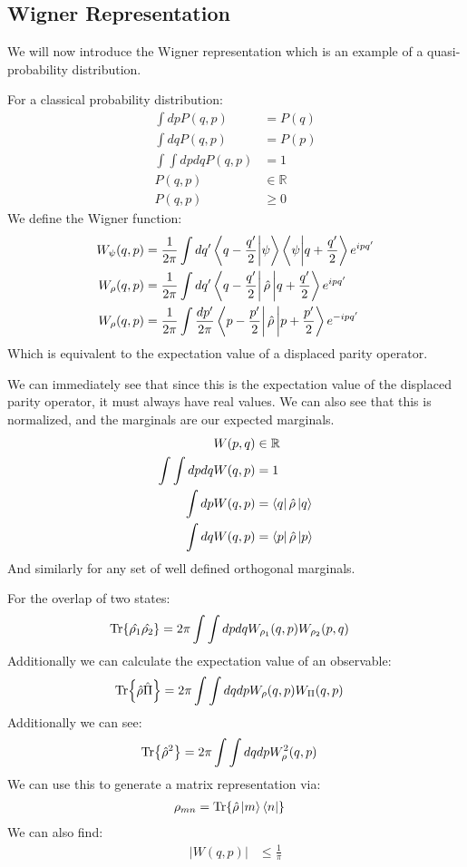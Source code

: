 \subsection{Wigner Representation}
We will now introduce the Wigner representation which is an example of a quasi-probability distribution.

For a classical probability distribution:
\begin{align*}
	\int dp P(q,p) &= P(q) \\
	\int dq P(q,p)&= P(p) \\
	\int\int dpdq P(q,p) &= 1 \\
	P(q,p) &\in \mathbb{R} \\
	P(q,p) & \geq 0
\end{align*}
We define the Wigner function:
\begin{align*}
	W_\psi(q,p) &= \frac{1}{2\pi} \int dq' \bra{q - \frac{q'}{2}}\ket{\psi}\bra{\psi}\ket{q + \frac{q'}{2}} e^{ipq'} \\
	W_\rho(q,p) &= \frac{1}{2\pi} \int dq' \bra{q - \frac{q'}{2}}\hat{\rho}\ket{q + \frac{q'}{2}} e^{ipq'} \\
	W_\rho(q,p) &= \frac{1}{2\pi} \int \frac{dp'}{2\pi} \bra{p - \frac{p'}{2}}\hat{\rho}\ket{p + \frac{p'}{2}} e^{-ipq'}
\end{align*}
Which is equivalent to the expectation value of a displaced parity operator.

We can immediately see that since this is the expectation value of the displaced parity operator, it must always have real values.
We can also see that this is normalized, and the marginals are our expected marginals.
\begin{align*}
	W(p,q) &\in \mathbb{R} \\
	\int\int dpdq W(q,p) &= 1 \\
	\int dp W(q,p) &= \bra{q}\hat{\rho}\ket{q} \\
	\int dq W(q,p)&= \bra{p}\hat{\rho}\ket{p}
\end{align*}
And similarly for any set of well defined orthogonal marginals. 

For the overlap of two states:
\begin{align*}
	\Tr{\hat{\rho_1}\hat{\rho_2}} &= 2\pi\int\int dpdq W_{\rho_1}(q,p)W_{\rho_2}(p,q)
\end{align*}
Additionally we can calculate the expectation value of an observable:
\begin{align*}
	\Tr{\hat{\rho}\hat{\Pi}} &= 2\pi\int \int dqdp W_\rho(q,p) W_\Pi(q,p)
\end{align*}
Additionally we can see:
\begin{align*}
	\Tr{\hat{\rho}^2} &= 2\pi\int\int dqdp W_\rho^2(q,p)
\end{align*}
We can use this to generate a matrix representation via:
\begin{align*}
	\rho_{mn} &=\Tr{\hat{\rho}\ket{m}\bra{n}}
\end{align*}
We can also find:
\begin{align*}
	|W(q,p)| &\leq \frac{1}{\pi}
\end{align*}

